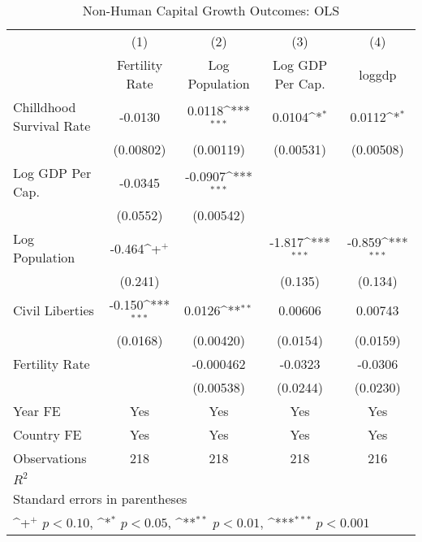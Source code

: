 \begin{table}[htbp]\centering
\def\sym#1{\ifmmode^{#1}\else\(^{#1}\)\fi}
\caption{Non-Human Capital Growth Outcomes: OLS}
\begin{tabular}{l*{4}{c}}
\toprule
                &\multicolumn{1}{c}{(1)}&\multicolumn{1}{c}{(2)}&\multicolumn{1}{c}{(3)}&\multicolumn{1}{c}{(4)}\\
                &\multicolumn{1}{c}{Fertility Rate}&\multicolumn{1}{c}{Log Population}&\multicolumn{1}{c}{Log GDP Per Cap.}&\multicolumn{1}{c}{loggdp}\\
\midrule
Chilldhood Survival Rate&  -0.0130         &   0.0118\sym{***}&   0.0104\sym{*}  &   0.0112\sym{*}  \\
                &(0.00802)         &(0.00119)         &(0.00531)         &(0.00508)         \\
\addlinespace
Log GDP Per Cap.&  -0.0345         &  -0.0907\sym{***}&                  &                  \\
                & (0.0552)         &(0.00542)         &                  &                  \\
\addlinespace
Log Population  &   -0.464\sym{+}  &                  &   -1.817\sym{***}&   -0.859\sym{***}\\
                &  (0.241)         &                  &  (0.135)         &  (0.134)         \\
\addlinespace
Civil Liberties &   -0.150\sym{***}&   0.0126\sym{**} &  0.00606         &  0.00743         \\
                & (0.0168)         &(0.00420)         & (0.0154)         & (0.0159)         \\
\addlinespace
Fertility Rate  &                  &-0.000462         &  -0.0323         &  -0.0306         \\
                &                  &(0.00538)         & (0.0244)         & (0.0230)         \\
\addlinespace
Year FE         &      Yes         &      Yes         &      Yes         &      Yes         \\
\addlinespace
Country FE      &      Yes         &      Yes         &      Yes         &      Yes         \\
\midrule
Observations    &      218         &      218         &      218         &      216         \\
\(R^{2}\)       &                  &                  &                  &                  \\
\bottomrule
\multicolumn{5}{l}{\footnotesize Standard errors in parentheses}\\
\multicolumn{5}{l}{\footnotesize \sym{+} \(p<0.10\), \sym{*} \(p<0.05\), \sym{**} \(p<0.01\), \sym{***} \(p<0.001\)}\\
\end{tabular}
\end{table}
